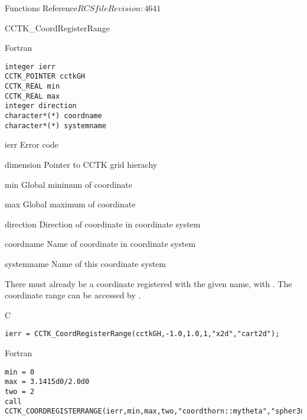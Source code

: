 \begin{cactuspart}{ Functions Reference}{$RCSfile$}{$Revision: 4641 $}
\begin{FunctionDescription}{CCTK\_CoordRegisterRange}
\begin{SynopsisSection}
\begin{Synopsis}{Fortran}
\begin{verbatim}
integer ierr
CCTK_POINTER cctkGH
CCTK_REAL min
CCTK_REAL max
integer direction
character*(*) coordname
character*(*) systemname \end{verbatim}
\end{Synopsis}
\end{SynopsisSection}
\begin{ParameterSection}
\begin{Parameter}{ierr}
Error code
\end{Parameter}
\begin{Parameter}{dimension}
Pointer to CCTK grid hierachy
\end{Parameter}
\begin{Parameter}{min}
Global minimum of coordinate
\end{Parameter}
\begin{Parameter}{max}
Global maximum of coordinate
\end{Parameter}
\begin{Parameter}{direction}
Direction of coordinate in coordinate system
\end{Parameter}
\begin{Parameter}{coordname}
Name of coordinate in coordinate system
\end{Parameter}
\begin{Parameter}{systemname}
Name of this coordinate system
\end{Parameter}
\end{ParameterSection}
\begin{Discussion}
There must already
be a coordinate registered with the given name, with
.
The coordinate range
can be accessed by .
\end{Discussion}
\begin{ExampleSection}
\begin{Example}{C}
\begin{verbatim}
ierr = CCTK_CoordRegisterRange(cctkGH,-1.0,1.0,1,"x2d","cart2d");
\end{verbatim}
\end{Example}
\begin{Example}{Fortran}
\begin{verbatim}
min = 0
max = 3.1415d0/2.0d0
two = 2
call CCTK_COORDREGISTERRANGE(ierr,min,max,two,"coordthorn::mytheta","spher3d")
\end{verbatim}
\end{Example}
\end{ExampleSection}
\end{FunctionDescription}


\end{cactuspart}

